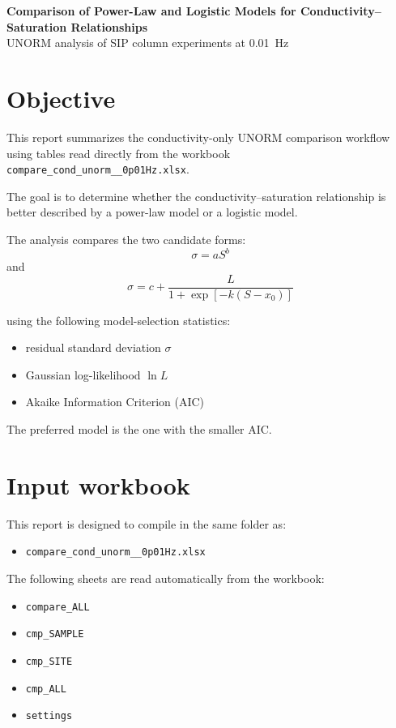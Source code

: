 \documentclass[11pt]{article}
\newcommand{\ReportFreq}{0.01}
\newcommand{\CompareXLSX}{compare_cond_unorm__0p01Hz.xlsx}
\begin{document}
\begin{center}
{\LARGE\bfseries\color{accent}
Comparison of Power-Law and Logistic Models for Conductivity--Saturation Relationships}\\[0.4em]
{\large UNORM analysis of SIP column experiments at \ReportFreq\ Hz}
\end{center}

\section{Objective}

This report summarizes the conductivity-only UNORM comparison workflow using tables read directly from the workbook
\texttt{\CompareXLSX}.

The goal is to determine whether the conductivity--saturation relationship is better described by a power-law model or a logistic model.

The analysis compares the two candidate forms:
\[
\sigma = aS^b
\]
and
\[
\sigma = c + \frac{L}{1+\exp[-k(S-x_0)]}
\]

using the following model-selection statistics:

\begin{itemize}[leftmargin=1.5em]
\item residual standard deviation $\sigma$
\item Gaussian log-likelihood $\ln L$
\item Akaike Information Criterion (AIC)
\end{itemize}

The preferred model is the one with the smaller AIC.

\section{Input workbook}

This report is designed to compile in the same folder as:

\begin{itemize}[leftmargin=1.5em]
\item \texttt{\CompareXLSX}
\end{itemize}

The following sheets are read automatically from the workbook:

\begin{itemize}[leftmargin=1.5em]
\item \texttt{compare\_ALL}
\item \texttt{cmp\_SAMPLE}
\item \texttt{cmp\_SITE}
\item \texttt{cmp\_ALL}
\item \texttt{settings}
\end{itemize}
\end{document}
